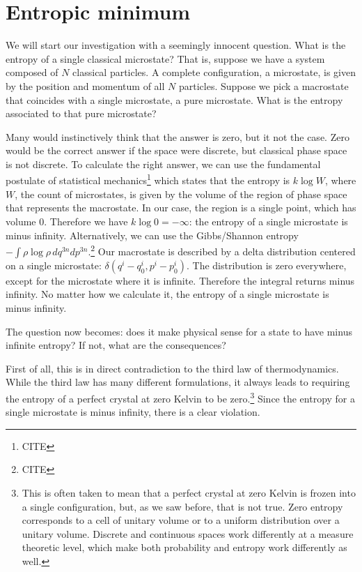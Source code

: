 \documentclass[10pt,twocolumn, nofootinbib]{revtex4-2}
\begin{document}
\section{Entropic minimum}

We will start our investigation with a seemingly innocent question. What is the entropy of a single classical microstate? That is, suppose we have a system composed of $N$ classical particles. A complete configuration, a microstate, is given by the position and momentum of all $N$ particles. Suppose we pick a macrostate that coincides with a single microstate, a pure microstate. What is the entropy associated to that pure microstate?

Many would instinctively think that the answer is zero, but it not the case. Zero would be the correct answer if the space were discrete, but classical phase space is not discrete. To calculate the right answer, we can use the fundamental postulate of statistical mechanics\footnote{CITE} which states that the entropy is $k \log W$, where $W$, the count of microstates, is given by the volume of the region of phase space that represents the macrostate. In our case, the region is a single point, which has volume $0$. Therefore we have $k \log 0 = -\infty$: the entropy of a single microstate is minus infinity. Alternatively, we can use the Gibbs/Shannon entropy $ -\int \rho \log \rho \, dq^{3n} dp^{3n}$.\footnote{CITE} Our macrostate is described by a delta distribution centered on a single microstate: $\delta(q^i-q^i_0, p^i-p^i_0)$. The distribution is zero everywhere, except for the microstate where it is infinite. Therefore the integral returns minus infinity. No matter how we calculate it, the entropy of a single microstate is minus infinity. 

The question now becomes: does it make physical sense for a state to have minus infinite entropy? If not, what are the consequences?

First of all, this is in direct contradiction to the third law of thermodynamics. While the third law has many different formulations, it always leads to requiring the entropy of a perfect crystal at zero Kelvin to be zero.\footnote{This is often taken to mean that a perfect crystal at zero Kelvin is frozen into a single configuration, but, as we saw before, that is not true. Zero entropy corresponds to a cell of unitary volume or to a uniform distribution over a unitary volume. Discrete and continuous spaces work differently at a measure theoretic level, which make both probability and entropy work differently as well.} Since the entropy for a single microstate is minus infinity, there is a clear violation.
\end{document}
